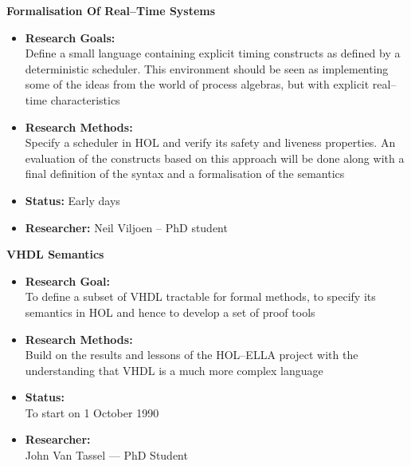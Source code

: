 \begin{center}{\bf Formalisation Of Real--Time Systems}\end{center}
\begin{itemize}
\item {\bf Research Goals:} $\;$ \\
Define a small language containing explicit timing constructs as defined by a 
deterministic scheduler. This environment should be seen as implementing
some of the ideas from the world of process algebras, but with explicit 
real--time
characteristics 
\item {\bf Research Methods:} $\;$ \\
Specify a scheduler in {\small HOL} and verify its safety and liveness
properties.  An evaluation of the constructs based on this approach will be 
done along with a final definition of the syntax and a formalisation of the
semantics
\item {\bf Status:} 
Early days
\item {\bf Researcher:} 
Neil Viljoen -- PhD student
\end{itemize}

\newpage
\begin{center}{\bf VHDL Semantics}\end{center}
\begin{itemize}
\item {\bf Research Goal:} $\;$ \\
To define a subset of {\small VHDL} tractable for formal methods, 
to specify its semantics in {\small HOL} and hence 
to develop a set of proof tools
\item {\bf Research Methods:} $\;$ \\
Build on the results and lessons of the {\small HOL}--{\small ELLA} project
with the understanding that {\small VHDL} is a much more complex language
\item {\bf Status:}$\;$ \\
To start on 1 October 1990
\item {\bf Researcher:} $\;$ \\
John Van Tassel --- PhD Student
\end{itemize}

